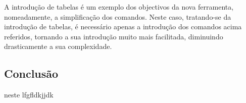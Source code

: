 \documentclass[11pt,a4paper]{article}
\begin{document}
A introdução de tabelas é um exemplo dos objectivos da nova ferramenta, nomeadamente, a simplificação dos comandos. Neste caso, tratando-se da introdução de tabelas, é necessário apenas a introdução dos comandos acima referidos, tornando a sua introdução muito mais facilitada, diminuindo drasticamente a sua complexidade. 

 \newpage 

\subsection{Conclusão}

neste lfgfldkjjdk
\end{document}
